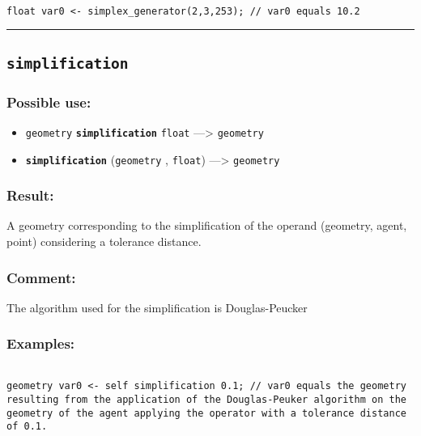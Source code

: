 \documentclass[]{book}
\providecommand{\tightlist}{%
  \setlength{\itemsep}{0pt}\setlength{\parskip}{0pt}}
\theoremstyle{definition}
\theoremstyle{definition}
\theoremstyle{definition}
\theoremstyle{remark}
\begin{document}
\begin{verbatim}
 
float var0 <- simplex_generator(2,3,253); // var0 equals 10.2
\end{verbatim}

\begin{center}\rule{0.5\linewidth}{\linethickness}\end{center}

\subsection{\texorpdfstring{\texttt{simplification}}{simplification}}\label{simplification}

\subsubsection{Possible use:}\label{possible-use-475}

\begin{itemize}
\tightlist
\item
  \texttt{geometry} \textbf{\texttt{simplification}} \texttt{float}
  ---\textgreater{} \texttt{geometry}
\item
  \textbf{\texttt{simplification}} (\texttt{geometry} , \texttt{float})
  ---\textgreater{} \texttt{geometry}
\end{itemize}

\subsubsection{Result:}\label{result-459}

A geometry corresponding to the simplification of the operand (geometry,
agent, point) considering a tolerance distance.

\subsubsection{Comment:}\label{comment-88}

The algorithm used for the simplification is Douglas-Peucker

\subsubsection{Examples:}\label{examples-331}

\begin{verbatim}
 
geometry var0 <- self simplification 0.1; // var0 equals the geometry resulting from the application of the Douglas-Peuker algorithm on the geometry of the agent applying the operator with a tolerance distance of 0.1.
\end{verbatim}
\end{document}
